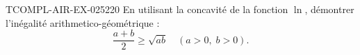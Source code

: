 \begin{exercice}{TCOMPL-AIR-EX-025}{2}{20}
En utilisant la concavité de la fonction $\ln$, démontrer l'inégalité arithmetico-géométrique :
\[ \frac{a+b}{2} \geq \sqrt{ab} \quad (a > 0,\; b > 0). \]

\end{exercice}

